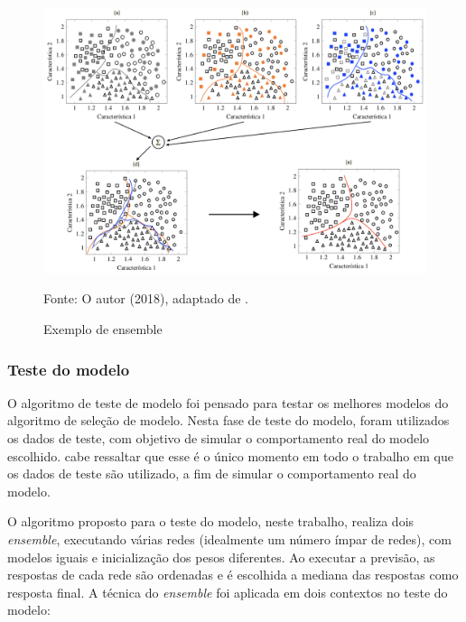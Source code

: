 \begin{figure}[ht!]
    \centering
    \caption{Exemplo de ensemble}
    \includegraphics[scale=1.45]{Figuras/Cap4/ensemble.png}
    \begin{center}
    Fonte:
        O autor (2018), adaptado de \cite{zhang2012ensemble}.
    \end{center}
         
        \label{fig:ensemble}
\end{figure}


\subsubsection{Teste do modelo}
\label{sec:meto1}

O algoritmo de teste de modelo foi pensado para testar os melhores modelos do algoritmo de seleção de modelo. Nesta fase de teste do modelo, foram utilizados os dados de teste, com objetivo de simular o comportamento real do modelo escolhido. cabe ressaltar que esse é o único momento em todo o trabalho em que os dados de teste são utilizado, a fim de simular o comportamento real do modelo.

O algoritmo proposto para o teste do modelo, neste trabalho, realiza dois \textit{ensemble}, executando várias redes (idealmente um número ímpar de redes), com modelos iguais e inicialização dos pesos diferentes.  Ao executar a previsão, as respostas de cada rede são ordenadas e é escolhida a mediana das respostas como resposta final. 
A técnica do \textit{ensemble} foi aplicada em dois contextos no teste do modelo:

